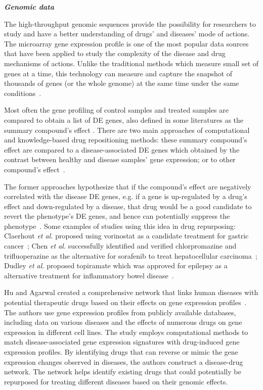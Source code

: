 \textit{\textbf{Genomic data}}

The high-throughput genomic sequences provide the possibility for researchers to study and have a better understanding of drugs' and diseases' mode of actions. 
The microarray gene expression profile is one of the most popular data sources that have been applied to study the complexity of the disease and drug mechanisms of actions. Unlike the traditional methods which measure small set of genes at a time, this technology can measure and capture the snapshot of thousands of genes (or the whole genome) at the same time under the same conditions~\cite{slonim2009getting}. 

Most often the gene profiling of control samples and treated samples are compared to obtain a list of DE genes, also defined in some literatures as the summary compound's effect \cite{shaw2003transcriptional}. 
There are two main approaches of computational and knowledge-based drug repositioning methods: these summary compound's effect are compared to a disease-associated DE genes which obtained by the contrast between healthy and disease samples' gene expression; or to other compound's effect~\cite{iorio2013transcriptional}. 

The former approaches hypothesize that if the compound's effect are negatively correlated with the disease DE genes, e.g. if a gene is up-regulated by a drug's effect and down-regulated by a disease, that drug would be a good candidate to revert the phenotype's DE genes, and hence can potentially suppress the phenotype~\cite{sirota2011discovery, mcart2011identification}. Some examples of studies using this idea in drug repurposing: Claerhout \textit{et al.} proposed using vorinostat as a candidate treatment for gastric cancer~\cite{claerhout2011gene}; Chen \textit{et al.} successfully identified and verified chlorpromazine and trifluoperazine as the alternative for sorafenib to treat hepatocellular carcinoma~\cite{chen2011gene}; Dudley \textit{et al.} proposed topiramate which was approved for epilepsy as a alternative treatment for inflammatory bowel disease~\cite{dudley2011computational}. 

Hu and Agarwal created a comprehensive network that links human diseases with potential therapeutic drugs based on their effects on gene expression profiles~\cite{hu2009human}.
The authors use gene expression profiles from publicly available databases, including data on various diseases and the effects of numerous drugs on gene expression in different cell lines.
The study employs computational methods to match disease-associated gene expression signatures with drug-induced gene expression profiles.
By identifying drugs that can reverse or mimic the gene expression changes observed in diseases, the authors construct a disease-drug network.
The network helps identify existing drugs that could potentially be repurposed for treating different diseases based on their genomic effects.

